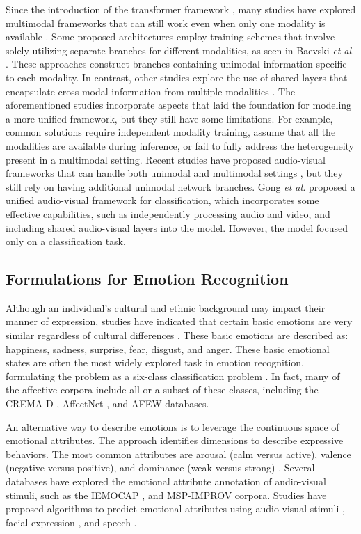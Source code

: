 \documentclass{article}
\def \etal {\textit{et al. }}
\begin{document}
Since the introduction of the transformer framework \cite{Vaswani_2017}, many studies have explored multimodal frameworks that can still work even when only one modality is available \cite{jaegle_2021}. Some proposed architectures employ training schemes that involve solely utilizing separate branches for different modalities, as seen in Baevski \etal \cite{baevski_2022}. These approaches construct branches containing unimodal information specific to each modality. In contrast, other studies explore the use of shared layers that encapsulate cross-modal information from multiple modalities \cite{dai_2022, shvetsova_2022}. The aforementioned studies incorporate aspects that laid the foundation for modeling a more unified framework, but they still have some limitations. For example, common solutions require independent modality training, assume that all the modalities are available during inference, or fail to fully address the heterogeneity present in a multimodal setting. Recent studies have proposed audio-visual frameworks that can handle both unimodal and multimodal settings \cite{Goncalves_2022}, but they still rely on having additional unimodal network branches. Gong \etal \cite{gong_2022} proposed a unified audio-visual framework for classification, which incorporates some effective capabilities, such as independently processing audio and video, and including shared audio-visual layers into the model. However, the model focused only on a classification task.

\subsection{Formulations for Emotion Recognition}
\label{ssec:formulations}


Although an individual's cultural and ethnic background may impact their manner of expression, studies have indicated that certain basic emotions are very similar regardless of cultural differences \cite{Ekman_1971}. These basic emotions are described as: happiness, sadness, surprise, fear, disgust, and anger. These basic emotional states are often the most widely explored task in emotion recognition, formulating the problem as a six-class classification problem \cite{Goncalves_2022_2, ghaleb_2020}. In fact, many of the affective corpora include all or a subset of these classes, including the CREMA-D \cite{Cao_2014_2}, AffectNet \cite{Mollahosseini_2019}, and AFEW \cite{Dhall_2012} databases. 


An alternative way to describe emotions is to leverage the continuous space of emotional attributes. The approach identifies dimensions to describe expressive behaviors. The most common attributes are arousal (calm versus active), valence (negative versus positive), and dominance (weak versus strong) \cite{Bradley_1994}. Several databases have explored the emotional attribute annotation of audio-visual stimuli, such as the IEMOCAP \cite{Busso_2008_5}, and MSP-IMPROV \cite{Busso_2017} corpora. Studies have proposed algorithms to predict emotional attributes using audio-visual stimuli \cite{Schoneveld_2021, atmaja_2020}, facial expression \cite{wasi_2023}, and speech \cite{ Schuller_2018, Wagner_2022, Leem_2022}.
\end{document}

